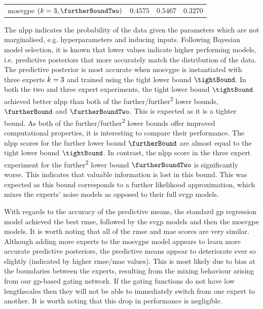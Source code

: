 \documentclass{mimosis-class/mimosis}
\numberwithin{equation}{chapter}
\newcommand{\modeInd}{\ensuremath{k}}
\newcommand{\ModeInd}{\ensuremath{\MakeUppercase{\modeInd}}}
\begin{document}
{\begin{table}[htbp]
\begin{tabular}{llll}
\acrshort{mosvgpe} \((k=3 ,\furtherBoundTwo)\) & \(0.4575\) & \(0.5467\) & \(0.3270\)\\
\end{tabular}
\end{table}
The \acrshort{nlpp} indicates the probability of the data given the
parameters which are not marginalised, e.g. hyperparameters and inducing inputs.
Following Bayesian model selection, it is known that lower values indicate higher performing models, i.e.
predictive posteriors that more accurately match the distribution of the data.
The predictive posterior is most accurate when \acrshort{mosvgpe} is instantiated with three experts \(\ModeInd=3\)
and trained using the tight lower bound \(\tightBound\).
In both the two and three expert experiments,
the tight lower bound \(\tightBound\) achieved better \acrshort{nlpp} than both of the further/further\textsuperscript{2}
lower bounds,  \(\furtherBound\) and \(\furtherBoundTwo\).
This is expected as it is a tighter bound.
As both of the further/further\textsuperscript{2} lower bounds offer improved computational properties,
it is interesting to compare their performance.
The \acrshort{nlpp} scores for the further lower bound \(\furtherBound\) are almost equal to the tight lower bound \(\tightBound\).
In contrast, the \acrshort{nlpp} score in the three expert experiment for the further\textsuperscript{2} lower bound \(\furtherBoundTwo\) is
significantly worse.
This indicates that valuable information is lost in this bound.
This was expected as this bound corresponds to a further likelihood approximation,
which mixes the experts' noise models as opposed to their full \acrshort{svgp} models.


With regards to the accuracy of the predictive means,
the standard \acrshort{gp} regression model achieved the best \acrshort{rmse}, followed by the \acrshort{svgp} models and then the
\acrshort{mosvgpe} models.
It is worth noting that all of the \acrshort{rmse} and \acrshort{mae} scores are very similar.
Although adding more experts to the \acrshort{mosvgpe} model appears to learn more accurate predictive posteriors, the
predictive means appear to deteriorate ever so slightly (indicated by higher \acrshort{rmse}/\acrshort{mae} values).
This is most likely due to bias at the boundaries between the experts,
resulting from the mixing behaviour arising from our \acrshort{gp}-based gating network.
If the gating functions do not have low lengthscales then they will not be able to immediately switch
from one expert to another.
It is worth noting that this drop in performance is negligible.

}
\end{document}
